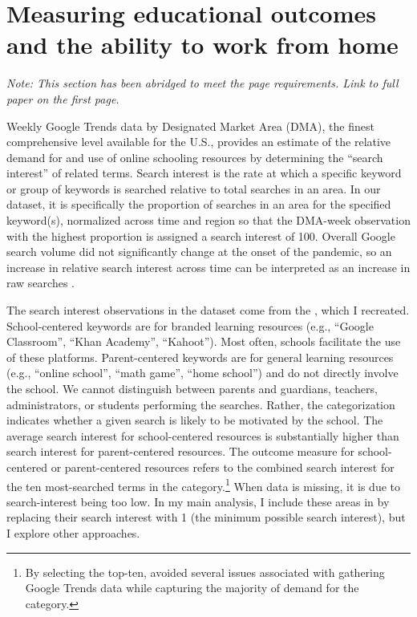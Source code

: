 \section{Measuring educational outcomes and the ability to work from home}
\if{}
{\small
    \textit{Note: This section has been abridged to meet the page requirements. Link to full paper on the first page.}
}
\fi

\if{}
Weekly Google Trends data by Designated Market Area (DMA), the finest comprehensive level available for the U.S., provides an estimate of the relative demand for and use of online schooling resources by determining the “search interest” of related terms.
Search interest is the rate at which a specific keyword or group of keywords is searched relative to total searches in an area.
In our dataset, it is specifically the proportion of searches in an area for the specified keyword(s), normalized across time and region so that the DMA-week observation with the highest proportion is assigned a search interest of 100.
Overall Google search volume did not significantly change at the onset of the pandemic, so an increase in relative search interest across time can be interpreted as an increase in raw searches \citep{bh1}.
\par
The search interest observations in the dataset come from the \cite{bh1}, which I recreated.
School-centered keywords are for branded learning resources (e.g., “Google Classroom”, “Khan Academy”, “Kahoot”).
Most often, schools facilitate the use of these platforms.
Parent-centered keywords are for general learning resources (e.g., “online school”, “math game”, “home school”) and do not directly involve the school.
We cannot distinguish between parents and guardians, teachers, administrators, or students performing the searches.
Rather, the categorization indicates whether a given search is likely to be motivated by the school.
The average search interest for school-centered resources is substantially higher than search interest for parent-centered resources. The outcome measure for school-centered or parent-centered resources refers to the combined search interest for the ten most-searched terms in the category.\footnote{By selecting the top-ten, \cite{bh1} avoided several issues associated with gathering Google Trends data while capturing the majority of demand for the category.} When data is missing, it is due to search-interest being too low.
In my main analysis, I include these areas in by replacing their search interest with 1 (the minimum possible search interest), but I explore other approaches.
\par
\fi

